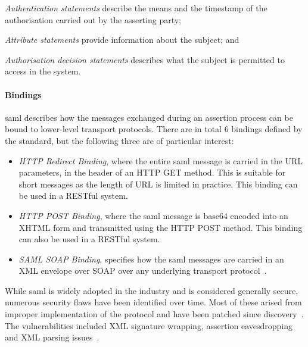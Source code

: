 \begin{enumerate*}[label=(\roman*)]
    \item \textit{Authentication statements} describe the means and the timestamp of the authorisation carried out by the asserting party;
    \item \textit{Attribute statements} provide information about the subject; and
    \item \textit{Authorisation decision statements} describes what the subject is permitted to access in the system.
\end{enumerate*}


\paragraph{Bindings}
\acrshort{saml} describes how the messages exchanged during an assertion process can be bound to lower-level transport protocols. There are in total 6 bindings defined by the standard, but the following three are of particular interest:

\begin{itemize}[noitemsep]
    \item \textit{HTTP Redirect Binding}, where the entire \acrshort{saml} message is carried in the URL parameters, in the header of an HTTP GET method. This is suitable for short messages as the length of URL is limited in practice. This binding can be used in a RESTful system.
    \item \textit{HTTP POST Binding}, where the \acrshort{saml} message is base64 encoded into an XHTML form and transmitted using the HTTP POST method. This binding can also be used in a RESTful system.
    \item \textit{SAML SOAP Binding}, specifies how the \acrshort{saml} messages are carried in an XML envelope over SOAP over any underlying transport protocol~\cite{Cantor2005BindingsV2.0}.
\end{itemize}


While \acrshort{saml} is widely adopted in the industry and is considered generally secure, numerous security flaws have been identified over time. Most of these arised from improper implementation of the protocol and have been patched since discovery~\cite{Krawczyk2014SecureAttacks}. The vulnerabilities included XML signature wrapping, assertion eavesdropping~\cite{Chen2014Environment-BoundAssertions} and XML parsing issues~\cite{Degges2018AVulnerability}.